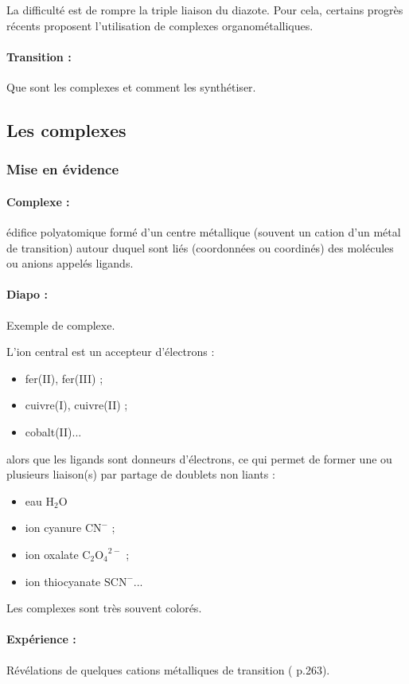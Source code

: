 La difficulté est de rompre la triple liaison du diazote. 
Pour cela, certains progrès récents proposent l'utilisation de complexes organométalliques.

\paragraph{Transition : } Que sont les complexes et comment les synthétiser.

\subsection{Les complexes}

\subsubsection{Mise en évidence}

\paragraph{Complexe : } édifice polyatomique formé d'un centre métallique (souvent un cation d'un métal de transition) autour duquel sont liés (coordonnées ou coordinés) des molécules ou anions appelés ligands.

\paragraph{Diapo :} Exemple de complexe.

L'ion central est un accepteur d'électrons :
\begin{itemize}
\item fer(II), fer(III) ;
\item cuivre(I), cuivre(II) ;
\item cobalt(II)...
\end{itemize}
alors que les ligands sont donneurs d'électrons, ce qui permet de former une ou plusieurs liaison(s) par partage de doublets non liants :
\begin{itemize}
\item eau $\mathrm{H_2O}$
\item ion cyanure $\mathrm{CN}^-$ ;
\item ion oxalate $\mathrm{C_2O_4}^{2-}$ ;
\item ion thiocyanate $\mathrm{SCN^-}$...
\end{itemize}
Les complexes sont très souvent colorés.

\paragraph{Expérience :} Révélations de quelques cations métalliques de transition (\cite{Buchere2017} p.263).

